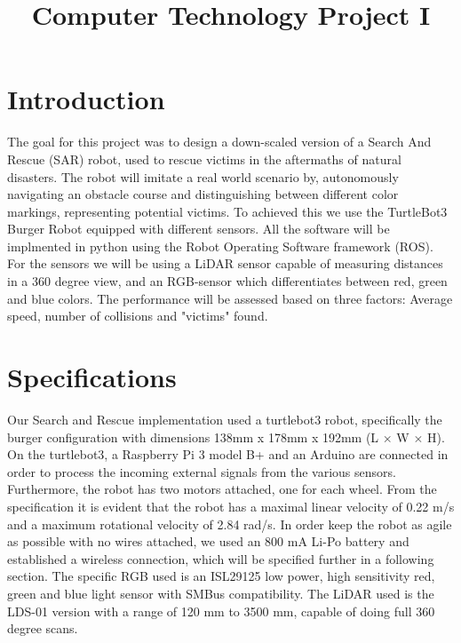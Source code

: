 \documentclass[conference]{IEEEtran}
\begin{document}
\title{Computer Technology Project I\\}

\author{
\and
{}
}

\maketitle

\begin{abstract}
\end{abstract}

\section{Introduction}
The goal for this project was to design a down-scaled version of a Search And Rescue (SAR) robot, used to rescue victims in the aftermaths of natural disasters.
The robot will imitate a real world scenario by, autonomously navigating an obstacle course and distinguishing between different color markings, representing potential victims. To achieved this we use the TurtleBot3 Burger Robot equipped with different sensors.
All the software will be implmented in python using the Robot Operating Software framework (ROS). For the sensors we will be using a LiDAR sensor capable of measuring distances in a 360 degree view, and an RGB-sensor which differentiates between red, green and blue colors. 
The performance will be assessed based on three factors: Average speed, number of collisions and "victims" found.

\section{Specifications}
Our Search and Rescue implementation used a turtlebot3 robot, specifically the burger configuration with dimensions 138mm x 178mm x 192mm (L $\times$ W $\times$ H)\cite{b1}.
On the turtlebot3, a Raspberry Pi 3 model B+ and an Arduino are connected in order to process the incoming external signals from the various sensors.
Furthermore, the robot has two motors attached, one for each wheel. From the specification it is evident that the robot has a maximal linear velocity of 0.22 m/s
and a maximum rotational velocity of 2.84 rad/s. In order keep the robot as agile as possible with no wires attached, we used an 800 mA Li-Po battery and established a wireless connection, which will be specified further in a following section.
The specific RGB used is an ISL29125 low power, high sensitivity red, green and blue light sensor with SMBus compatibility\cite{b2}.
The LiDAR used is the LDS-01 version with a range of 120 mm to 3500 mm, capable of doing full 360 degree scans. \cite{b3}
\end{document}
